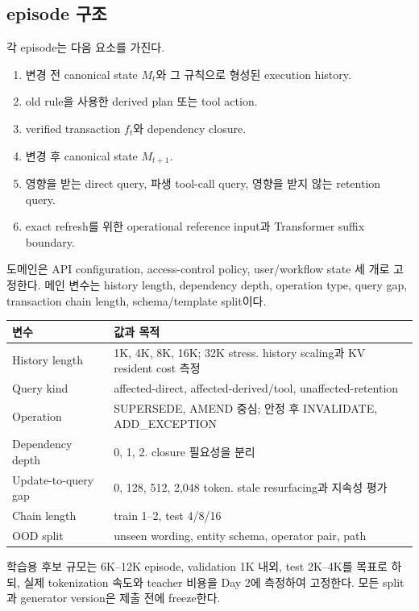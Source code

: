 \documentclass[10.5pt,a4paper]{article}
\begin{document}
\subsection{episode 구조}

각 episode는 다음 요소를 가진다.

\begin{enumerate}
\item 변경 전 canonical state $M_t$와 그 규칙으로 형성된 execution history.
\item old rule을 사용한 derived plan 또는 tool action.
\item verified transaction $f_t$와 dependency closure.
\item 변경 후 canonical state $M_{t+1}$.
\item 영향을 받는 direct query, 파생 tool-call query, 영향을 받지 않는 retention query.
\item exact refresh를 위한 operational reference input과 Transformer suffix boundary.
\end{enumerate}

도메인은 API configuration, access-control policy, user/workflow state 세 개로 고정한다. 메인 변수는 history length, dependency depth, operation type, query gap, transaction chain length, schema/template split이다.

\begin{table}[H]
\centering
\begin{tabularx}{\textwidth}{@{}L{37mm}Y@{}}
\toprule
변수 & 값과 목적 \\
\midrule
History length & 1K, 4K, 8K, 16K; 32K stress. history scaling과 KV resident cost 측정 \\
Query kind & affected-direct, affected-derived/tool, unaffected-retention \\
Operation & SUPERSEDE, AMEND 중심; 안정 후 INVALIDATE, ADD\_EXCEPTION \\
Dependency depth & 0, 1, 2. closure 필요성을 분리 \\
Update-to-query gap & 0, 128, 512, 2,048 token. stale resurfacing과 지속성 평가 \\
Chain length & train 1--2, test 4/8/16 \\
OOD split & unseen wording, entity schema, operator pair, path \\
\bottomrule
\end{tabularx}
\end{table}

학습용 후보 규모는 6K--12K episode, validation 1K 내외, test 2K--4K를 목표로 하되, 실제 tokenization 속도와 teacher 비용을 Day 2에 측정하여 고정한다. 모든 split과 generator version은 제출 전에 freeze한다.
\end{document}
